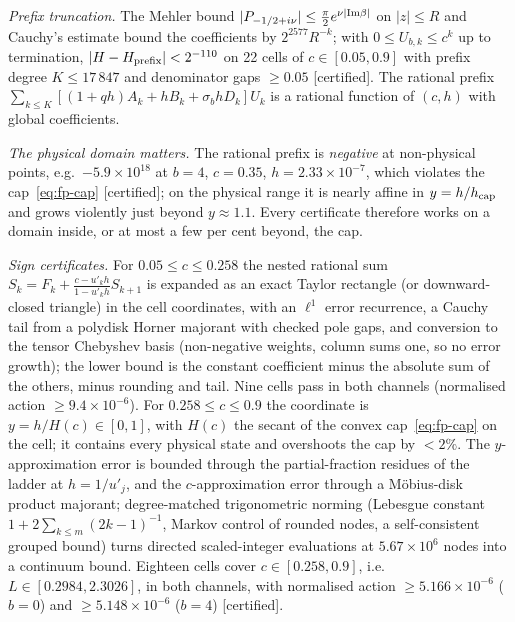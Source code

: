 \emph{Prefix truncation.} The Mehler bound $|P_{-1/2+i\nu}|\le\frac\pi2e^{\nu|{\rm Im}\beta|}$ on $|z|\le R$ and Cauchy's estimate bound the
coefficients by $2^{2577}R^{-k}$; with $0\le U_{b,k}\le c^k$ up to termination,
$|H-H_{\rm prefix}|<2^{-110}$ on 22 cells of $c\in[0.05,0.9]$ with prefix degree $K\le17\,847$ and denominator gaps $\ge0.05$ [certified].
The rational prefix $\sum_{k\le K}[(1+qh)A_k+hB_k+\sigma_bhD_k]U_k$ is a rational function of $(c,h)$ with global coefficients.

\emph{The physical domain matters.} The rational prefix is \emph{negative} at non-physical points, e.g.\ $-5.9\times10^{18}$ at $b=4$,
$c=0.35$, $h=2.33\times10^{-7}$, which violates the cap~\eqref{eq:fp-cap} [certified]; on the physical range it is nearly affine in
$y=h/h_{\rm cap}$ and grows violently just beyond $y\approx1.1$. Every certificate therefore works on a domain inside, or at most a few
per cent beyond, the cap.

\emph{Sign certificates.} For $0.05\le c\le0.258$ the nested rational sum $S_k=F_k+\frac{c-u'_kh}{1-u'_kh}S_{k+1}$ is expanded as an exact
Taylor rectangle (or downward-closed triangle) in the cell coordinates, with an $\ell^1$ error recurrence, a Cauchy tail from a
polydisk Horner majorant with checked pole gaps, and conversion to the tensor Chebyshev basis (non-negative weights, column sums one,
so no error growth); the lower bound is the constant coefficient minus the absolute sum of the others, minus rounding and tail. Nine
cells pass in both channels (normalised action $\ge9.4\times10^{-6}$). For $0.258\le c\le0.9$ the coordinate is $y=h/H(c)\in[0,1]$, with
$H(c)$ the secant of the convex cap~\eqref{eq:fp-cap} on the cell; it contains every physical state and overshoots the cap by $<2\%$.
The $y$-approximation error is bounded through the partial-fraction residues of the ladder at $h=1/u'_j$, and the $c$-approximation
error through a M\"obius-disk product majorant; degree-matched trigonometric norming (Lebesgue constant
$1+2\sum_{k\le m}(2k-1)^{-1}$, Markov control of rounded nodes, a self-consistent grouped bound) turns directed scaled-integer
evaluations at $5.67\times10^6$ nodes into a continuum bound. Eighteen cells cover $c\in[0.258,0.9]$, i.e.\ $L\in[0.2984,2.3026]$, in
both channels, with normalised action $\ge5.166\times10^{-6}$ ($b=0$) and $\ge5.148\times10^{-6}$ ($b=4$) [certified].

